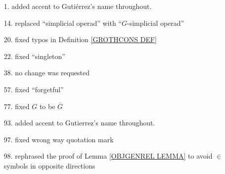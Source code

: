 \documentclass{article}
\begin{document}
\begin{itemize}
\item[1.] added accent to Guti\'{e}rrez's name throughout.

\item[14.] replaced ``simplicial operad'' with  ``$G$-simplicial operad''

\item[20.] fixed typos in Definition \ref{GROTHCONS DEF}

\item[22.] fixed ``singleton''

\item[38.] no change was requested

\item[57.] fixed ``forgetful''

\item[77.] fixed $G$ to be $\bar{G}$

\item[93.] added accent to Gutierrez's name throughout.

\item[97.] fixed wrong way quotation mark

\item[98.] rephrased the proof of Lemma \ref{OBJGENREL LEMMA}
to avoid $\in$ symbols in opposite directions

\end{itemize}








{}


\end{document}

